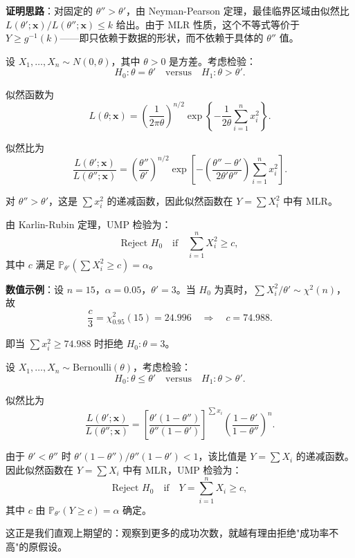 \textbf{证明思路}：对固定的 $\theta'' > \theta'$，由 Neyman-Pearson 定理，最佳临界区域由似然比 $L(\theta';\mathbf{x}) / L(\theta'';\mathbf{x}) \leq k$ 给出。由于 MLR 性质，这个不等式等价于 $Y \geq g^{-1}(k)$——即只依赖于数据的形状，而不依赖于具体的 $\theta''$ 值。
\begin{example}\label{ex:normal-variance-ump}
设 $X_1, \ldots, X_n \sim N(0, \theta)$，其中 $\theta > 0$ 是方差。考虑检验：
\[
H_0: \theta = \theta' \quad \text{versus} \quad H_1: \theta > \theta'.
\]

似然函数为
\[
L(\theta; \mathbf{x}) = \left(\frac{1}{2\pi\theta}\right)^{n/2} \exp\left\{-\frac{1}{2\theta}\sum_{i=1}^n x_i^2\right\}.
\]

似然比为
\[
\frac{L(\theta'; \mathbf{x})}{L(\theta''; \mathbf{x})} = \left(\frac{\theta''}{\theta'}\right)^{n/2} \exp\left[-\left(\frac{\theta'' - \theta'}{2\theta'\theta''}\right)\sum_{i=1}^n x_i^2\right].
\]

对 $\theta'' > \theta'$，这是 $\sum x_i^2$ 的递减函数，因此似然函数在 $Y = \sum X_i^2$ 中有 MLR。

由 Karlin-Rubin 定理，UMP 检验为：
\[
\text{Reject } H_0 \quad \text{if} \quad \sum_{i=1}^n X_i^2 \geq c,
\]
其中 $c$ 满足 $\mathbb{P}_{\theta'}(\sum X_i^2 \geq c) = \alpha$。

\textbf{数值示例}：设 $n = 15$，$\alpha = 0.05$，$\theta' = 3$。当 $H_0$ 为真时，$\sum X_i^2 / \theta' \sim \chi^2(n)$，故
\[
\frac{c}{3} = \chi^2_{0.95}(15) = 24.996 \quad \Rightarrow \quad c = 74.988.
\]

即当 $\sum x_i^2 \geq 74.988$ 时拒绝 $H_0: \theta = 3$。\end{example}

\begin{example}\label{ex:bernoulli-ump}
设 $X_1, \ldots, X_n \sim \mathrm{Bernoulli}(\theta)$，考虑检验：
\[
H_0: \theta \leq \theta' \quad \text{versus} \quad H_1: \theta > \theta'.
\]

似然比为
\[
\frac{L(\theta'; \mathbf{x})}{L(\theta''; \mathbf{x})} = \left[\frac{\theta'(1-\theta'')}{\theta''(1-\theta')}\right]^{\sum x_i} \left(\frac{1-\theta'}{1-\theta''}\right)^n.
\]

由于 $\theta' < \theta''$ 时 $\theta'(1-\theta'')/\theta''(1-\theta') < 1$，该比值是 $Y = \sum X_i$ 的递减函数。因此似然函数在 $Y = \sum X_i$ 中有 MLR，UMP 检验为：
\[
\text{Reject } H_0 \quad \text{if} \quad Y = \sum_{i=1}^n X_i \geq c,
\]
其中 $c$ 由 $\mathbb{P}_{\theta'}(Y \geq c) = \alpha$ 确定。

这正是我们直观上期望的：观察到更多的成功次数，就越有理由拒绝"成功率不高"的原假设。\end{example}

